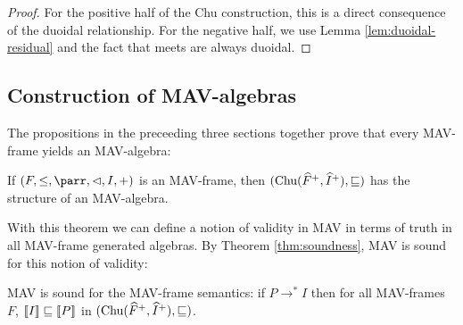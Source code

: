 \begin{proof}
  For the positive half of the Chu construction, this is a direct
  consequence of the duoidal relationship. For the negative half, we
  use Lemma \ref{lem:duoidal-residual} and the fact that meets are
  always duoidal.
\end{proof}

\subsection{Construction of MAV-algebras}

The propositions in the preceeding three sections together prove that
every MAV-frame yields an MAV-algebra:

\begin{theorem}\label{thm:algebra-from-frame}
  If $(F, \leq, \parr, \lhd, I, +)$ is an MAV-frame, then
  $(\mathrm{Chu}(\widehat{F}^+, \mathop{\widehat{I}^+}), \sqsubseteq)$ has the structure of an
  MAV-algebra.
\end{theorem}

With this theorem we can define a notion of validity in MAV in terms
of truth in all MAV-frame generated algebras. By Theorem
\ref{thm:soundness}, MAV is sound for this notion of validity:

\begin{theorem}\label{thm:mavframe-soundness}
  MAV is sound for the MAV-frame semantics: if $P \longrightarrow^* I$
  then for all MAV-frames $F$, $\llbracket I \rrbracket \sqsubseteq \llbracket P \rrbracket$ in
  $(\mathrm{Chu}(\widehat{F}^+, \mathop{\widehat{I}^+}), \sqsubseteq)$.
\end{theorem}

